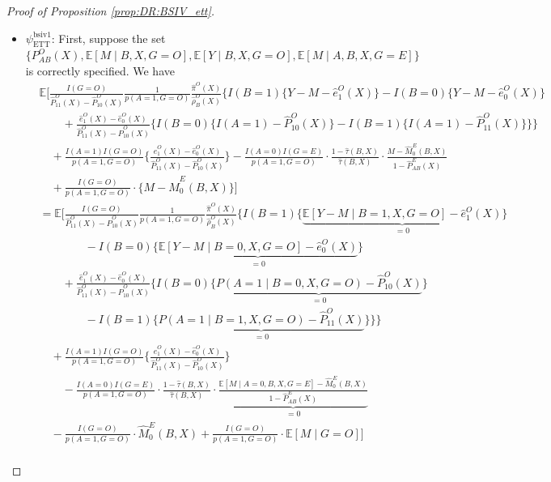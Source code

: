 \documentclass[10pt]{article}
\newcommand{\E}{\mathbb{E}}
\begin{document}
\begin{proof}[Proof of Proposition \ref{prop:DR:BSIV_ett}]


\begin{itemize}
    \item $\psi_{\text{ETT}}^{\text{bsiv1}}$:
First, suppose the set $\{P_{AB}^O(X),\mathbb{E}[M\mid B,X,G=O],\mathbb{E}[Y\mid B,X,G=O],\mathbb{E}[M\mid A,B,X,G=E]\}$ is correctly specified. We have
\begingroup
\allowdisplaybreaks
{\footnotesize \begin{align*}
&\E\Big[\frac{I(G=O)}{\hat{P}_{11}^O(X)-\hat{P}_{10}^O(X)}\frac{1}{p(A=1,G=O)}\frac{\hat{\pi}^O(X)}{\hat{\rho}_B^O(X)}\bigg\{I(B=1)\{Y-M-\hat{e}_1^O(X)\}-I(B=0)\{Y-M-\hat{e}_0^O(X)\}\\
&\quad\quad+\frac{\hat{e}_1^O(X)-\hat{e}_0^O(X)}{\hat{P}_{11}^O(X)-\hat{P}_{10}^O(X)}\big\{I(B=0)\{I(A=1)-\hat{P}_{10}^O(X)\}-I(B=1)\{I(A=1)-\hat{P}_{11}^O(X)\}\big\}\bigg\}\\
&\quad+\frac{I(A=1)I(G=O)}{p(A=1,G=O)}\Big\{\frac{\hat{e}_1^O(X)-\hat{e}_0^O(X)}{\hat{P}_{11}^O(X)-\hat{P}_{10}^O(X)}\Big\}-\frac{I(A=0)I(G=E)}{p(A=1,G=O)}\cdot\frac{1-\hat{\tau}(B,X)}{\hat{\tau}(B,X)}\cdot
\frac{M-\hat{M}_{0}^{E}(B,X)}{1-\hat{P}_{AB}^E(X)}\\
&\quad+\frac{I(G=O)}{p(A=1,G=O)}\cdot \{M-\hat{M}_{0}^{E}(B,X)\}\Big]\\
&=\E\Big[\frac{I(G=O)}{\hat{P}_{11}^O(X)-\hat{P}_{10}^O(X)}\frac{1}{p(A=1,G=O)}\frac{\hat{\pi}^O(X)}{\hat{\rho}_B^O(X)}\bigg\{I(B=1)\{\underbrace{\mathbb{E}[Y-M\mid B=1,X,G=O]-\hat{e}_1^O(X)}_{=0}\}\\
&\quad\quad\quad\quad-I(B=0)\{\underbrace{\mathbb{E}[Y-M\mid B=0,X,G=O]-\hat{e}_0^O(X)}_{=0}\}\\
&\quad\quad+\frac{\hat{e}_1^O(X)-\hat{e}_0^O(X)}{\hat{P}_{11}^O(X)-\hat{P}_{10}^O(X)}\big\{I(B=0)\{\underbrace{P(A=1\mid B=0,X,G=O)-\hat{P}_{10}^O(X)}_{=0}\}\\
&\quad\quad\quad\quad-I(B=1)\{\underbrace{P(A=1\mid B=1,X,G=O)-\hat{P}_{11}^O(X)}_{=0}\}\big\}\bigg\}\\
&\quad+\frac{I(A=1)I(G=O)}{p(A=1,G=O)}\Big\{\frac{\hat{e}_1^O(X)-\hat{e}_0^O(X)}{\hat{P}_{11}^O(X)-\hat{P}_{10}^O(X)}\Big\}\\
&\quad\quad-\frac{I(A=0)I(G=E)}{p(A=1,G=O)}\cdot\frac{1-\hat{\tau}(B,X)}{\hat{\tau}(B,X)}\cdot
\underbrace{\frac{\mathbb{E}[M\mid A=0,B,X,G=E]-\hat{M}_{0}^{E}(B,X)}{1-\hat{P}_{AB}^E(X)}}_{=0}\\
&\quad-\frac{I(G=O)}{p(A=1,G=O)}\cdot \hat{M}_{0}^{E}(B,X)+\frac{I(G=O)}{p(A=1,G=O)}\cdot \mathbb{E}[M\mid G=O]\Big]\\

\end{align*}}
\end{itemize}
\end{proof}
\end{document}
